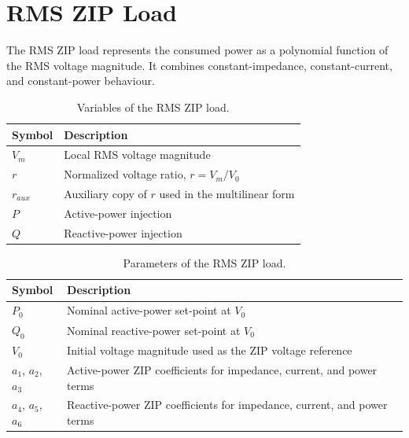 \section{RMS ZIP Load}

The RMS ZIP load represents the consumed power as a polynomial function of the RMS voltage magnitude. It combines constant-impedance, constant-current, and constant-power behaviour.

\begin{table}[H]
    \centering
    \caption{Variables of the RMS ZIP load.}
    \begin{tabular}{ll}
        \toprule
        Symbol & Description \\
        \midrule
        $V_m$ & Local RMS voltage magnitude \\
        $r$ & Normalized voltage ratio, $r=V_m/V_0$ \\
        $r_{aux}$ & Auxiliary copy of $r$ used in the multilinear form \\
        $P$ & Active-power injection \\
        $Q$ & Reactive-power injection \\
        \bottomrule
    \end{tabular}
\end{table}

\begin{table}[H]
    \centering
    \caption{Parameters of the RMS ZIP load.}
    \begin{tabular}{ll}
        \toprule
        Symbol & Description \\
        \midrule
        $P_0$ & Nominal active-power set-point at $V_0$ \\
        $Q_0$ & Nominal reactive-power set-point at $V_0$ \\
        $V_0$ & Initial voltage magnitude used as the ZIP voltage reference \\
        $a_1$, $a_2$, $a_3$ & Active-power ZIP coefficients for impedance, current, and power terms \\
        $a_4$, $a_5$, $a_6$ & Reactive-power ZIP coefficients for impedance, current, and power terms \\
        \bottomrule
    \end{tabular}
\end{table}

